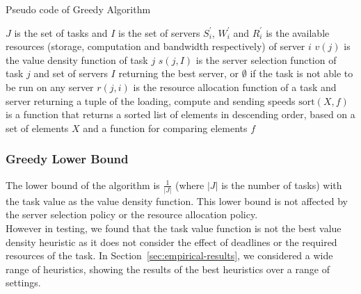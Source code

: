 \begin{algorithm}
    \caption{Pseudo code of Greedy Algorithm}
    \label{alg:greedy-algorithm}
    \begin{algorithmic}
        \REQUIRE $J$ is the set of tasks and $I$ is the set of servers
        \REQUIRE $S^{'}_i$, $W^{'}_i$ and $R^{'}_i$ is the available resources
            (storage, computation and bandwidth respectively) of server $i$
        \REQUIRE $v(j)$ is the value density function of task $j$
        \REQUIRE $s(j, I)$ is the server selection function of task $j$ and set of servers $I$ returning the best
            server, or $\emptyset$ if the task is not able to be run on any server
        \REQUIRE $r(j, i)$ is the resource allocation function of a task and server returning a tuple of the
            loading, compute and sending speeds
        \REQUIRE $\text{sort}(X, f)$ is a function that returns a sorted list of elements in descending order, based
            on a set of elements $X$ and a function for comparing elements $f$

            \ENDIF
        \ENDFOR
    \end{algorithmic}
\end{algorithm}

\subsubsection{Greedy Lower Bound}
\label{subsubsec:greedy-lower-bound}
The lower bound of the algorithm is $\frac{1}{\left|J\right|}$ (where $\left|J\right|$ is the number of tasks) with
the task value as the value density function. This lower bound is not affected by the server selection policy or the
resource allocation policy. \\
However in testing, we found that the task value function is not the best value density heuristic as it does not
consider the effect of deadlines or the required resources of the task. In Section~\ref{sec:empirical-results}, we
considered a wide range of heuristics, showing the results of the best heuristics over a range of settings.

